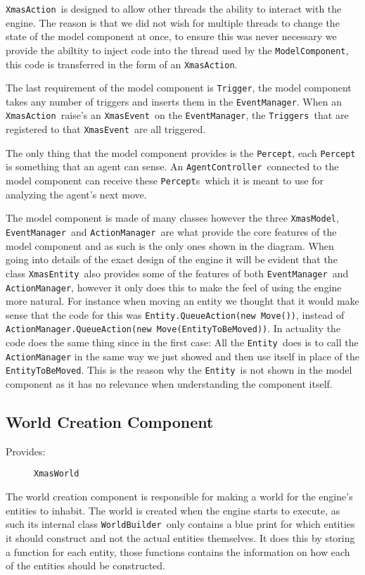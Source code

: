 \texttt{XmasAction }is designed to allow other threads the ability
to interact with the engine. The reason is that we did not wish for
multiple threads to change the state of the model component at once,
to ensure this was never necessary we provide the abiltity to inject
code into the thread used by the \texttt{ModelComponent}, this code
is transferred in the form of an \texttt{XmasAction}.

The last requirement of the model component is \texttt{Trigger}, the
model component takes any number of triggers and inserts them in the
\texttt{EventManager}. When an \texttt{XmasAction }raise\textquoteright{}s
an \texttt{XmasEvent }on the \texttt{EventManager}, the \texttt{Triggers
}that are registered to that \texttt{XmasEvent }are all triggered. 

The only thing that the model component provides is the \texttt{Percept},
each \texttt{Percept }is something that an agent can sense. An \texttt{AgentController
}connected to the model component can receive these \texttt{Percept}s\texttt{
}which it is meant to use for analyzing the agent\textquoteright{}s
next move.

The model component is made of many classes however the three \texttt{XmasModel},
\texttt{EventManager }and \texttt{ActionManager }are what provide
the core features of the model component and as such is the only ones
shown in the diagram. When going into details of the exact design
of the engine it will be evident that the class \texttt{XmasEntity
}also provides some of the features of both \texttt{EventManager }and
\texttt{ActionManager}, however it only does this to make the feel
of using the engine more natural. For instance when moving an entity
we thought that it would make sense that the code for this was \texttt{Entity.QueueAction(new
Move())}, instead of \texttt{ActionManager.QueueAction(new Move(EntityToBeMoved))}.
In actuality the code does the same thing since in the first case:
All the \texttt{Entity }does is to call the \texttt{ActionManager}
in the same way we just showed and then use itself in place of the
\texttt{EntityToBeMoved}. This is the reason why the \texttt{Entity
}is not shown in the model component as it has no relevance when understanding
the component itself.


\subsection{World Creation Component}
\begin{description}
\item [{Provides:}] \texttt{XmasWorld}
\end{description}
The world creation component is responsible for making a world for
the engine\textquoteright{}s entities to inhabit. The world is created
when the engine starts to execute, as such its internal class \texttt{WorldBuilder
}only contains a blue print for which entities it should construct
and not the actual entities themselves. It does this by storing a
function for each entity, those functions contains the information
on how each of the entities should be constructed.

